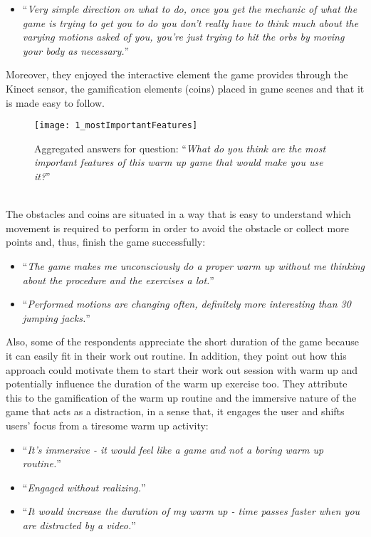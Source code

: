 \begin{itemize}
\item ``\textit{Very simple direction on what to do, once you get the mechanic of what the game is trying to get you to do you don't really have to think much about the varying motions asked of you, you're just trying to hit the orbs by moving your body as necessary.}''
\end{itemize} 
Moreover, they enjoyed the interactive element the game provides through the Kinect sensor, the gamification elements (coins) placed in game scenes and that it is made easy to follow. \\
\begin{figure}[h]
    \centering
    \texttt{[image: 1\_mostImportantFeatures]}
    \caption{Aggregated answers for question: ``\textit{What do you think are the most important features of this warm up game that would make you use it?}''}
    \label{fig:1_mostImportantFeatures}
\end{figure}\\The obstacles and coins are situated in a way that is easy to understand which movement is required to perform in order to avoid the obstacle or collect more points and, thus, finish the game successfully:
\begin{itemize}
\item ``\textit{The game makes me unconsciously do a proper warm up without me thinking about the procedure and the exercises a lot.}''
\item ``\textit{Performed motions are changing often, definitely more interesting than 30 jumping jacks.}''
\end{itemize} 
Also, some of the respondents appreciate the short duration of the game because it can easily fit in their work out routine. In addition, they point out how this approach could motivate them to start their work out session with warm up and potentially influence the duration of the warm up exercise too. They attribute this to the gamification of the warm up routine and the immersive nature of the game that acts as a distraction, in a sense that, it engages the user and shifts users' focus from a tiresome warm up activity:  
\begin{itemize}
\item ``\textit{It's immersive - it would feel like a game and not a boring warm up routine.}''
\item ``\textit{Engaged without realizing.}''
\item ``\textit{It would increase the duration of my warm up - time passes faster when you are distracted by a video.}''
\end{itemize} 
